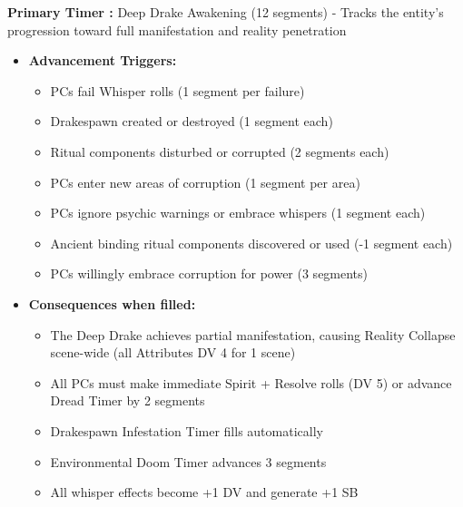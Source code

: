 \documentclass[11pt]{article}
\begin{document}
\textbf{Primary Timer :} Deep Drake Awakening (12 segments) - Tracks the entity's progression toward full manifestation and reality penetration
\begin{itemize}
\item \textbf{Advancement Triggers:}
  \begin{itemize}
  \item PCs fail Whisper rolls (1 segment per failure)
  \item Drakespawn created or destroyed (1 segment each)
  \item Ritual components disturbed or corrupted (2 segments each)
  \item PCs enter new areas of corruption (1 segment per area)
  \item PCs ignore psychic warnings or embrace whispers (1 segment each)
  \item Ancient binding ritual components discovered or used (-1 segment each)
  \item PCs willingly embrace corruption for power (3 segments)
  \end{itemize}
\item \textbf{Consequences when filled:}
  \begin{itemize}
  \item The Deep Drake achieves partial manifestation, causing Reality Collapse scene-wide (all Attributes DV 4 for 1 scene)
  \item All PCs must make immediate Spirit + Resolve rolls (DV 5) or advance Dread Timer by 2 segments
  \item Drakespawn Infestation Timer fills automatically
  \item Environmental Doom Timer advances 3 segments
  \item All whisper effects become +1 DV and generate +1 SB
  \end{itemize}
\end{itemize}
\end{document}
